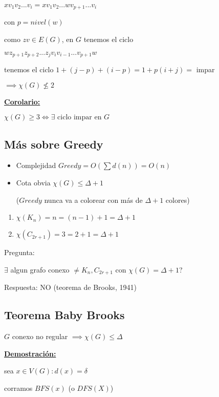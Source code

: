 \documentclass[12pt]{article}
\begin{document}
$xv_{1}v_{2}...v_{i} = xv_{1}v_{2}...wv_{p+1}...v_{i}$

con $p = nivel(w)$  \bigskip

como $zv \in E(G)$, en $G$ tenemos el ciclo

$wz_{p+1}z_{p+2}...z_{j}v_{i}v_{i-1}...v_{p+1}w$\bigskip

tenemos el ciclo $1 + (j - p) + (i -p) = 1  + p(i + j) =$ impar

\(\implies \chi(G) \nleq 2\)\bigskip

\underline{\textbf{Corolario:}}

\(\chi(G) \geq 3 \iff \exists \text{ ciclo impar en } G\)\bigskip

\subsection*{Más sobre Greedy}
\begin{itemize}
\item Complejidad $Greedy = O(\sum d(n)) = O(n)$
\item Cota obvia $\chi(G) \leq \Delta + 1$

($Greedy$ nunca va a colorear con más de $\Delta + 1$ colores)
\end{itemize}

\begin{enumerate}
\item \(\chi(K_n) = n = (n-1) + 1 = \Delta + 1\)
\item \(\chi(C_{2r+1}) = 3 = 2+1 = \Delta + 1\)
\end{enumerate} \bigskip

Pregunta:

$\exists$ algun grafo conexo $\neq K_n, C_{2r+1}$ con $\chi(G) = \Delta +1 $?\bigskip

Respuesta: NO (teorema de Brooks, 1941)\bigskip

\newpage
\begin{center}
\subsection*{Teorema Baby Brooks}

$G$ conexo no regular $\implies \chi(G) \leq \Delta$ 
\end{center}

\underline{\textbf{Demostración:}}

sea $x \in V(G) : d(x) = \delta$\bigskip

corramos $BFS(x)$ (o $DFS(X)$)
\end{document}

